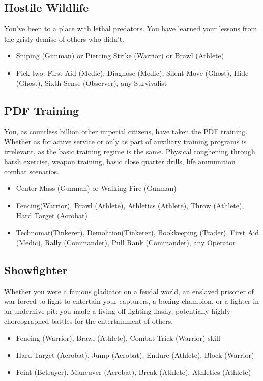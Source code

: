 	\subsection{Hostile Wildlife}
	You've been to a place with lethal predators. You have learned your lessons from the grisly demise of others who didn't.
	\begin{itemize}
		\item Sniping (Gunman) or Piercing Strike (Warrior) or Brawl (Athlete)
		\item Pick two: First Aid (Medic), Diagnose (Medic), Silent Move (Ghost), Hide (Ghost), Sixth Sense (Observer), any Survivalist 
	\end{itemize}

	\subsection{PDF Training}
	You, as countless billion other imperial citizens, have taken the PDF training. Whether as for active service or only as part of auxiliary training programs is irrelevant, as the basic training regime is the same. Physical toughening through harsh exercise, weapon training, basic close quarter drills, life ammunition combat scenarios.
	\begin{itemize}
		\item Center Mass (Gunman) or Walking Fire (Gunman)
		\item Fencing(Warrior), Brawl (Athlete), Athletics (Athlete), Throw (Athlete), Hard Target (Acrobat)
		\item Technomat(Tinkerer), Demolition(Tinkerer), Bookkeeping (Trader), First Aid (Medic), Rally (Commander), Pull Rank (Commander), any Operator
	\end{itemize}

	\subsection{Showfighter}
	Whether you were a famous gladiator on a feudal world, an enslaved prisoner of war forced to fight to entertain your capturers, a boxing champion, or a fighter in an underhive pit: you made a living off fighting flashy, potentially highly choreographed battles for the entertainment of others.
	\begin{itemize}
		\item Fencing (Warrior), Brawl (Athlete), Combat Trick (Warrior) skill
		\item Hard Target (Acrobat), Jump (Acrobat), Endure (Athlete), Block (Warrior)
		\item Feint (Betrayer), Maneuver (Acrobat), Break (Athlete), Athletics (Athlete)
	\end{itemize}

